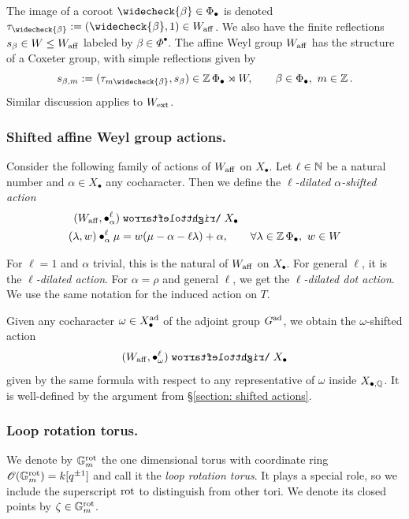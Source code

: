 The image of a coroot $\widecheck{\beta} \in \Phi_{\bullet}$ is denoted $\tau_{\widecheck{\beta}}:= (\widecheck{\beta}, 1) \in W_{\aff}$. We also have the finite reflections $s_{\beta} \in W \leq W_{\mathrm{aff}}$ labeled by $\beta \in \Phi^{\bullet}$.
%
The affine Weyl group $W_{\mathrm{aff}}$ has the structure of a Coxeter group, with simple reflections given by
\begin{equation*}
    s_{\beta, m} := (\tau_{m\widecheck{\beta}}, s_{\beta}) \in \Z\Phi_{\bullet} \rtimes W, \qquad \beta \in \Phi_{\bullet}, \ m \in \Z. 
\end{equation*}
Similar discussion applies to $W_{\mathrm{ext}}$.


\subsubsection{Shifted affine Weyl group actions.}\label{section: shifted affine weyl group actions}
Consider the following family of actions of $W_{\mathrm{aff}}$ on $X_{\bullet}$.
Let $\ell \in \operatorname{\mathbb{N}}$ be a natural number and $\alpha \in X_{\bullet}$ any cocharacter. Then we define the \emph{$\ell$-dilated $\alpha$-shifted action}
\begin{align*}
    (W_{\aff}, \bullet^{\ell}_{\alpha}) & \acts X_{\bullet} \\
    (\lambda, w ) \bullet^{\ell}_{\alpha} \mu & = w(\mu - \alpha - \ell \lambda) + \alpha, \qquad \forall \lambda \in \Z\Phi_{\bullet}, \ w \in W
\end{align*}

For $\ell = 1$ and $\alpha$ trivial, this is the natural of $W_{\mathrm{aff}}$ on $X_{\bullet}$. For general $\ell$, it is the \emph{$\ell$-dilated action}. For $\alpha = \rho$ and general $\ell$, we get the \emph{$\ell$-dilated dot action}. We use the same notation for the induced action on $T$.


Given any cocharacter $\omega \in X^{\operatorname{ad}}_{\bullet}$ of the adjoint group $G^{\operatorname{ad}}$, we obtain the $\omega$-shifted action
\begin{equation*}
   (W_{\aff}, \bullet^{\ell}_{\omega})  \acts X_{\bullet} 
\end{equation*}
given by the same formula with respect to any representative of $\omega$ inside $X_{\bullet, \operatorname{\mathbb{Q}}}$. It is well-defined by the argument from \S \ref{section: shifted actions}.







\subsubsection{Loop rotation torus.}
We denote by $\mathbb{G}_m^{\mathrm{rot}}$ the one dimensional torus with coordinate ring $\operatorname{\mathscr{O}}(\mathbb{G}_m^{\mathrm{rot}}) = k[q^{\pm 1}]$ and call it the \textit{loop rotation torus}. It plays a special role, so we include the superscript $\mathrm{rot}$ to distinguish from other tori. We denote its closed points by $\zeta \in \mathbb{G}_m^{\mathrm{rot}}$.

